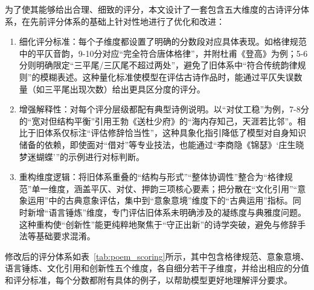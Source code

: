 为了使其能够给出合理、细致的评分，本文设计了一套包含五大维度的古诗评分体系，在先前评分体系的基础上针对性地进行了优化和改进：

\begin{enumerate}
  \item 细化评分标准：每个子维度都设置了明确的分数段对应具体表现。如格律规范中的平仄音韵，9-10分对应“完全符合唐体格律”，并附杜甫《登高》为例；5-6分则明确限定“三平尾/三仄尾不超过两处”，避免了旧体系中“符合传统韵律规则”的模糊表述。这种量化标准使模型在评估古诗作品时，能通过平仄失误数量（如三平尾出现次数）给出更具区分度的评分。
  \item 增强解释性：对每个评分层级都配有典型诗例说明。以“对仗工稳”为例，7-8分的“宽对但结构平衡”引用王勃《送杜少府》的“海内存知己，天涯若比邻”。相比于旧体系仅标注“评估修辞恰当性”，这种具象化指引降低了模型对自身知识储备的依赖，即使面对“借对”等专业技法，也能通过“李商隐《锦瑟》‘庄生晓梦迷蝴蝶’”的示例进行对标判断。
  \item 重构维度逻辑：将旧体系重叠的“结构与形式”“整体协调性”整合为“格律规范”单一维度，涵盖平仄、对仗、押韵三项核心要素；把分散在“文化引用”“意象运用”中的古典意象评估，集中到“意象意境”维度下的“古典运用”指标。同时新增“语言锤炼”维度，专门评估旧体系未明确涉及的凝练度与典雅度问题。这种重构使“创新性”能更纯粹地聚焦于“守正出新”的诗学突破，避免与修辞手法等基础要求混淆。
\end{enumerate}

修改后的评分体系如表~\ref{tab:poem_scoring}所示，其中包含格律规范、意象意境、语言锤炼、文化引用和创新性五个维度，各自细分若干子维度，并给出相应的分值和评分标准，每个分数都附有具体的例子，以帮助模型更好地理解评分要求。

